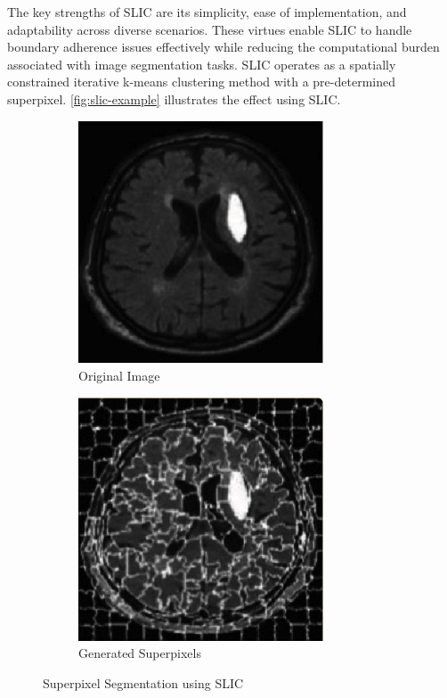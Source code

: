 The key strengths of SLIC are its simplicity, ease of implementation, and adaptability across diverse scenarios. These virtues enable SLIC to handle boundary adherence issues effectively while reducing the computational burden associated with image segmentation tasks. SLIC operates as a spatially constrained iterative k-means clustering method with a pre-determined superpixel. \autoref{fig:slic-example} illustrates the effect using SLIC. 

\begin{figure}[htp]
    \centering
    \begin{subfigure}[b]{0.45\textwidth}
        \centering
        \includegraphics[width=0.8\textwidth]{./figures/slic-img.png}
        \caption{Original Image}
        \label{fig:slic-img}
    \end{subfigure}
    \hfill
    \begin{subfigure}[b]{0.45\textwidth}
        \centering
        \includegraphics[width=0.8\textwidth]{./figures/slic-seg.png}
        \caption{Generated Superpixels}
        \label{fig:slic-seg}
    \end{subfigure}
    \caption{Superpixel Segmentation using SLIC}
    \label{fig:slic-example}
\end{figure}

